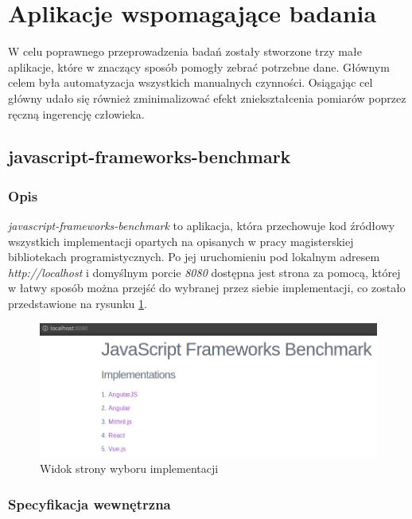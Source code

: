 \documentclass[polish, twoside, 12pt]{mwart}
\let\stdsection\section
\renewcommand*{\section}{\clearpage\stdsection}
\begin{document}
\section{Aplikacje wspomagające badania}

W celu poprawnego przeprowadzenia badań zostały stworzone trzy małe aplikacje, które w znaczący sposób pomogły zebrać potrzebne dane. Głównym celem była automatyzacja wszystkich manualnych czynności. Osiągając cel główny udało się również zminimalizować efekt zniekształcenia pomiarów poprzez ręczną ingerencję człowieka.

\subsection{javascript-frameworks-benchmark}

\subsubsection{Opis}

\emph{javascript-frameworks-benchmark} to aplikacja, która przechowuje kod źródłowy wszystkich implementacji opartych na opisanych w pracy magisterskiej bibliotekach programistycznych. Po jej uruchomieniu pod lokalnym adresem \emph{http://localhost} i domyślnym porcie \emph{8080} dostępna jest strona za pomocą, której w łatwy sposób można przejść do wybranej przez siebie implementacji, co zostało przedstawione na rysunku \ref{fig:javascript-frameworks-benchmark}.

\begin{figure}[ht]
  \includegraphics[width=\textwidth]{javascript-frameworks-benchmark.png}
  \caption{Widok strony wyboru implementacji}
  \label{fig:javascript-frameworks-benchmark}
\end{figure}

\subsubsection{Specyfikacja wewnętrzna}
\end{document}
